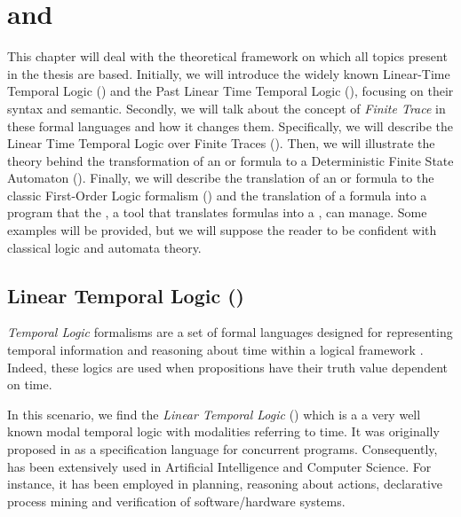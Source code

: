 \chapter{\PLTL and \LTLf}\label{ch:theory}
This chapter will deal with the theoretical framework on which all topics present in the thesis are based. Initially, we will introduce the widely known Linear-Time Temporal Logic (\LTL) and the Past Linear Time Temporal Logic (\PLTL), focusing on their syntax and semantic. Secondly, we will talk about the concept of \textit{Finite Trace} in these formal languages and how it changes them. Specifically, we will describe the Linear Time Temporal Logic over Finite Traces (\LTLf). Then, we will illustrate the theory behind the transformation of an \LTLf or \PLTL formula to a Deterministic Finite State Automaton (\DFA). Finally, we will describe the translation of an \LTLf or \PLTL formula to the classic First-Order Logic formalism (\FOL) and the translation of a \FOL formula into a program that the \MONA, a tool that translates formulas into a \DFA, can manage. Some examples will be provided, but we will suppose the reader to be confident with classical logic and automata theory.
\section{Linear Temporal Logic (\LTL)}\label{sec:ltl-definition}
\textit{Temporal Logic} formalisms are a set of formal languages designed for representing temporal information and reasoning about time within a logical framework \citep{sep-logic-temporal}. Indeed, these logics are used when propositions have their truth value dependent on time.

In this scenario, we find the \textit{Linear Temporal Logic} (\LTL) which is a a very well known modal temporal logic with modalities referring to time. It was originally proposed in \citep{Pnueli:1977:TLP:1382431.1382534} as a specification language for concurrent programs. Consequently, \LTL has been extensively used in Artificial Intelligence and Computer Science. For instance, it has been employed in planning, reasoning about actions, declarative process mining and verification of software/hardware systems.
